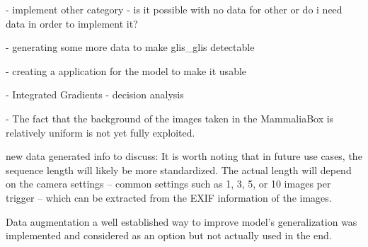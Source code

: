 - implement other category - is it possible with no data for other or do i need data in order to implement it?

- generating some more data to make glis\_glis detectable

- creating a application for the model to make it usable

- Integrated Gradients - decision analysis

- The fact that the background of the images taken in the MammaliaBox is relatively uniform is not yet fully exploited.



new data generated info to discuss:
It is worth noting that in future use cases, the sequence length will likely be more standardized.
The actual length will depend on the camera settings -- common settings such as 1, 3, 5, or 10 images per trigger -- which can be extracted from the EXIF information of the images.

Data augmentation a well established way to improve model's generalization \autocite{shortenSurveyImageData2019} was implemented and considered as an option but not actually used in the end.